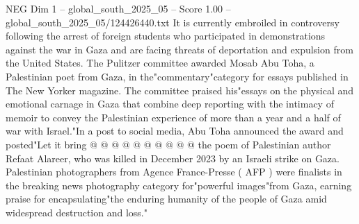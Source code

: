 \begin{textsample}{NEG Dim 1 – global\_south\_2025\_05 – Score 1.00 – global\_south\_2025\_05/124426440.txt}
It is currently embroiled in controversy following the arrest of foreign students who participated in demonstrations against the war in Gaza and are facing threats of deportation and expulsion from the United States.
The Pulitzer committee awarded Mosab Abu Toha, a Palestinian poet from Gaza, in the"commentary"category for essays published in The New Yorker magazine.
The committee praised his"essays on the physical and emotional carnage in Gaza that combine deep reporting with the intimacy of memoir to convey the Palestinian experience of more than a year and a half of war with Israel."In a post to social media, Abu Toha announced the award and posted"Let it bring @ @ @ @ @ @ @ @ @ @ the poem of Palestinian author Refaat Alareer, who was killed in December 2023 by an Israeli strike on Gaza.
Palestinian photographers from Agence France-Presse ( AFP ) were finalists in the breaking news photography category for"powerful images"from Gaza, earning praise for encapsulating"the enduring humanity of the people of Gaza amid widespread destruction and loss."

\end{textsample}
